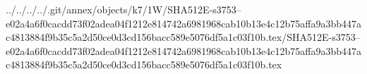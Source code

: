 ../../../../.git/annex/objects/k7/1W/SHA512E-s3753--e02a4a6f0cacdd73f02adea04f1212e814742a6981968cab10b13e4c12b75affa9a3bb447ac4813884f9b35c5a2d50ce0d3cd156bacc589e5076df5a1c03f10b.tex/SHA512E-s3753--e02a4a6f0cacdd73f02adea04f1212e814742a6981968cab10b13e4c12b75affa9a3bb447ac4813884f9b35c5a2d50ce0d3cd156bacc589e5076df5a1c03f10b.tex